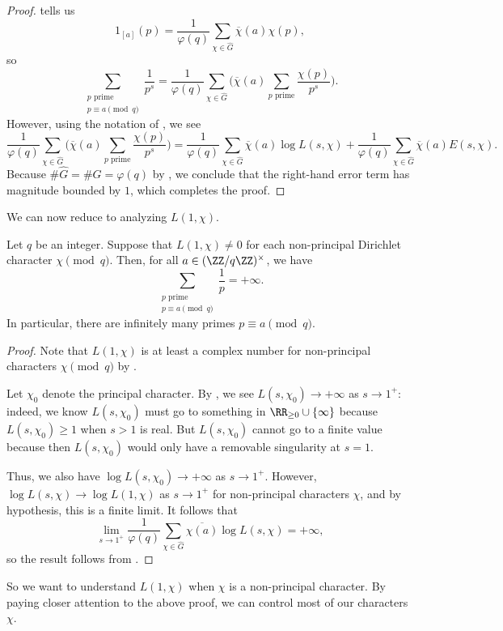 \documentclass[../notes.tex]{subfiles}
\begin{document}
\begin{proof}
	 tells us
	\[1_{[a]}(p)=\frac1{\varphi(q)}\sum_{\chi\in\widehat G}\overline\chi(a)\chi(p),\]
	so
	\[\sum_{\substack{p\text{ prime}\\p\equiv a\pmod q}}\frac1{p^s}=\frac1{\varphi(q)}\sum_{\chi\in\widehat G}\Bigg(\overline\chi(a)\sum_{p\text{ prime}}\frac{\chi(p)}{p^s}\Bigg).\]
	However, using the notation of , we see
	\[\frac1{\varphi(q)}\sum_{\chi\in\widehat G}\Bigg(\overline\chi(a)\sum_{p\text{ prime}}\frac{\chi(p)}{p^s}\Bigg)=\frac1{\varphi(q)}\sum_{\chi\in\widehat G}\overline\chi(a)\log L(s,\chi)+\frac1{\varphi(q)}\sum_{\chi\in\widehat G}\overline\chi(a)E(s,\chi).\]
	Because $\#\widehat G=\#G=\varphi(q)$ by , we conclude that the right-hand error term has magnitude bounded by $1$, which completes the proof.
\end{proof}
We can now reduce  to analyzing $L(1,\chi)$.
\begin{proposition}
	Let $q$ be an integer. Suppose that $L(1,\chi)\ne0$ for each non-principal Dirichlet character $\chi\pmod q$. Then, for all $a\in(\ZZ/q\ZZ)^\times$, we have
	\[\sum_{\substack{p\text{ prime}\\p\equiv a\pmod q}}\frac1{p}=+\infty.\]
	In particular, there are infinitely many primes $p\equiv a\pmod q$.
\end{proposition}
\begin{proof}
	Note that $L(1,\chi)$ is at least a complex number for non-principal characters $\chi\pmod q$ by .

	Let $\chi_0$ denote the principal character. By , we see $L(s,\chi_0)\to+\infty$ as $s\to1^+$: indeed, we know $L(s,\chi_0)$ must go to something in $\RR_{\ge0}\cup\{\infty\}$ because $L(s,\chi_0)\ge1$ when $s>1$ is real. But $L(s,\chi_0)$ cannot go to a finite value because then $L(s,\chi_0)$ would only have a removable singularity at $s=1$.

	Thus, we also have $\log L(s,\chi_0)\to+\infty$ as $s\to1^+$. However, $\log L(s,\chi)\to\log L(1,\chi)$ as $s\to1^+$ for non-principal characters $\chi$, and by hypothesis, this is a finite limit. It follows that
	\[\lim_{s\to1^+}\frac1{\varphi(q)}\sum_{\chi\in\widehat G}\overline{\chi(a)}\log L(s,\chi)=+\infty,\]
	so the result follows from .
\end{proof}
So we want to understand $L(1,\chi)$ when $\chi$ is a non-principal character. By paying closer attention to the above proof, we can control most of our characters $\chi$.
\end{document}
